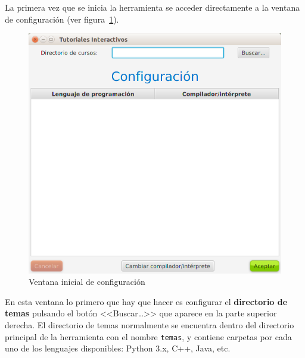 \documentclass[]{article}
\begin{document}
La primera vez que se inicia la herramienta se acceder directamente a la ventana de configuración (ver figura~\ref{fig:config1}).
%
\begin{figure}[tbp]
\begin{center}
\includegraphics[scale=0.4]{Configuracion_vacia.png}
\end{center}
\caption{Ventana inicial de configuración\label{fig:config1}}
\end{figure}
%
En esta ventana lo primero que hay que hacer es configurar el \textbf{directorio de temas} pulsando el botón <<Buscar\ldots>> que aparece en la parte superior derecha. El directorio de temas normalmente se encuentra dentro del directorio principal de la herramienta con el nombre \texttt{temas}, y contiene carpetas por cada uno de los lenguajes disponibles: Python 3.x, C++, Java, etc. 
\end{document}
